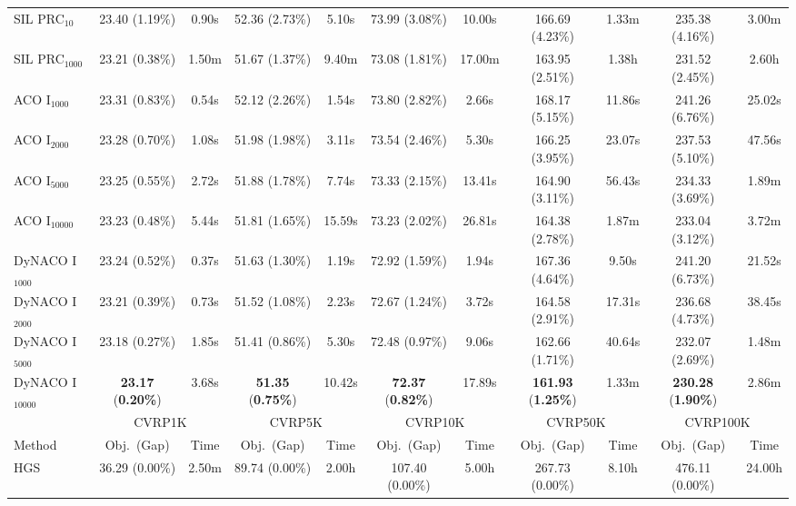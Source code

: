 \documentclass[sigconf,review]{acmart}
\newcommand{\CVRP}{\textsc{CVRP}}
\begin{document}
\begin{table}[t]
{\begin{tabular}{lcccccccccc}
SIL PRC$_{10}$ & 23.40 (1.19\%) & 0.90s & 52.36 (2.73\%) & 5.10s & 73.99 (3.08\%) & 10.00s & 166.69 (4.23\%) & 1.33m & 235.38 (4.16\%) & 3.00m \\
SIL PRC$_{1000}$ & 23.21 (0.38\%) & 1.50m & 51.67 (1.37\%) & 9.40m & 73.08 (1.81\%) & 17.00m & 163.95 (2.51\%) & 1.38h & 231.52 (2.45\%) & 2.60h \\
\midrule
ACO I$_{1000}$ & 23.31 (0.83\%) & 0.54s & 52.12 (2.26\%) & 1.54s & 73.80 (2.82\%) & 2.66s & 168.17 (5.15\%) & 11.86s & 241.26 (6.76\%) & 25.02s \\
ACO I$_{2000}$ & 23.28 (0.70\%) & 1.08s & 51.98 (1.98\%) & 3.11s & 73.54 (2.46\%) & 5.30s & 166.25 (3.95\%) & 23.07s & 237.53 (5.10\%) & 47.56s \\
ACO I$_{5000}$ & 23.25 (0.55\%) & 2.72s & 51.88 (1.78\%) & 7.74s & 73.33 (2.15\%) & 13.41s & 164.90 (3.11\%) & 56.43s & 234.33 (3.69\%) & 1.89m \\
ACO I$_{10000}$ & 23.23 (0.48\%) & 5.44s & 51.81 (1.65\%) & 15.59s & 73.23 (2.02\%) & 26.81s & 164.38 (2.78\%) & 1.87m & 233.04 (3.12\%) & 3.72m \\
\midrule
DyNACO I$_{1000}$ & 23.24 (0.52\%) & 0.37s & 51.63 (1.30\%) & 1.19s & 72.92 (1.59\%) & 1.94s & 167.36 (4.64\%) & 9.50s & 241.20 (6.73\%) & 21.52s \\
DyNACO I$_{2000}$ & 23.21 (0.39\%) & 0.73s & 51.52 (1.08\%) & 2.23s & 72.67 (1.24\%) & 3.72s & 164.58 (2.91\%) & 17.31s & 236.68 (4.73\%) & 38.45s \\
DyNACO I$_{5000}$ & 23.18 (0.27\%) & 1.85s & 51.41 (0.86\%) & 5.30s & 72.48 (0.97\%) & 9.06s & 162.66 (1.71\%) & 40.64s & 232.07 (2.69\%) & 1.48m \\
DyNACO I$_{10000}$ & \textbf{23.17} (\textbf{0.20\%}) & 3.68s & \textbf{51.35} (\textbf{0.75\%}) & 10.42s & \textbf{72.37} (\textbf{0.82\%}) & 17.89s & \textbf{161.93} (\textbf{1.25\%}) & 1.33m & \textbf{230.28} (\textbf{1.90\%}) & 2.86m \\
\midrule
\midrule
& \multicolumn{2}{c}{\CVRP{}1K} & \multicolumn{2}{c}{\CVRP{}5K} & \multicolumn{2}{c}{\CVRP{}10K} & \multicolumn{2}{c}{\CVRP{}50K} & \multicolumn{2}{c}{\CVRP{}100K} \\
\cmidrule(lr){2-3} \cmidrule(lr){4-5} \cmidrule(lr){6-7} \cmidrule(lr){8-9} \cmidrule(lr){10-11}
Method & Obj.\ (Gap) & Time & Obj.\ (Gap) & Time & Obj.\ (Gap) & Time & Obj.\ (Gap) & Time & Obj.\ (Gap) & Time \\
\midrule
HGS & 36.29 (0.00\%) & 2.50m & 89.74 (0.00\%) & 2.00h & 107.40 (0.00\%) & 5.00h & 267.73 (0.00\%) & 8.10h & 476.11 (0.00\%) & 24.00h \\

\end{tabular}}
\end{table}
\end{document}
